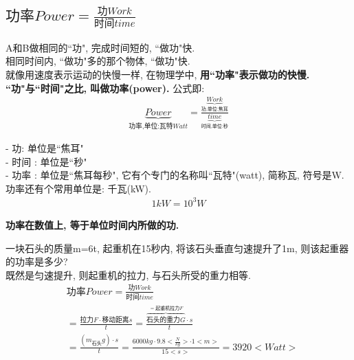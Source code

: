 \documentclass[UTF8]{ctexart}
\begin{document}
	
	
\subsection{$\text{功率}Power=\frac{\text{功}Work}{\text{时间}time}$ }	

A和B做相同的``功",  完成时间短的, ``做功"快. \\
相同时间内, ``做功"多的那个物体, ``做功"快. \\
	
就像用速度表示运动的快慢一样, 在物理学中, \textbf{用``功率"表示做功的快慢. ``功"与``时间"之比, 叫做功率(power).} 公式即:
\begin{align}
	\boxed{
	\underset{\text{功率,单位:瓦特}Watt}{\underbrace{Power}}=\frac{\underset{\text{功,单位:焦耳}}{\underbrace{Work}}}{\underset{\text{时间,单位:秒}}{\underbrace{time}}}		
	}
\end{align}

- 功: 单位是``焦耳" \\
- 时间 : 单位是``秒" \\
- 功率 : 单位是``焦耳每秒", 它有个专门的名称叫``瓦特"(watt), 简称瓦, 符号是W. 功率还有个常用单位是: 千瓦(kW). \\
\begin{align*}
	\boxed{
	1kW = 10^3 W
	}
\end{align*}

\textbf{功率在数值上, 等于单位时间内所做的功.}



\begin{tcolorbox}[title = {例},boxrule={0.1em},colframe={black!10}, colback={black!3},colbacktitle={black!10},coltitle={black}]
	一块石头的质量m=6t, 起重机在15秒内, 将该石头垂直匀速提升了1m, 则该起重器的功率是多少? \\
	
	既然是匀速提升, 则起重机的拉力, 与石头所受的重力相等.	
	\begin{align*}
			&\text{功率}Power=\frac{\text{功}Work}{\text{时间}time}\\
		&=\frac{\text{拉力}F\cdot \text{移动距离}s}{t}=\frac{\overset{=\text{起重机拉力}F}{\overbrace{\text{石头的重力}G}}\cdot s}{t}\\
		&=\frac{\left( m_{\text{石头}}g \right) \cdot s}{t}=\frac{6000kg\cdot 9.8<\frac{N}{kg}>\cdot 1<m>}{15<s>}=3920<Watt>\\		
	\end{align*}
\end{tcolorbox}
\end{document}
